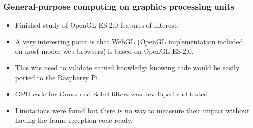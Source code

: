 \subsubsection{General-purpose computing on graphics processing units}
\begin{itemize}
	\item Finished study of OpenGL ES 2.0 features of interest.
	\item A very interesting point is that WebGL (OpenGL implementation included on most moder web browsers) is based on OpenGL ES 2.0.
	\item This was used to validate earned knowledge knowing code would be easily ported to the Raspberry Pi.
	\item GPU code for Gauss and Sobel filters was developed and tested.
	\item Limitations were found but there is no way to meassure their impact without having the frame reception code ready.
\end{itemize}

